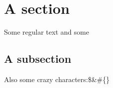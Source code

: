 \documentclass{article}%
\begin{document}
%
\normalsize%
\section{A section}%
\label{sec:Asection}%
Some regular text and some%
\subsection{A subsection}%
\label{subsec:Asubsection}%
Also some crazy characters:\$\&\#\{\}

%
\end{document}
